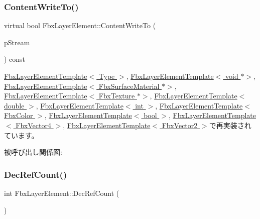 \subsubsection{\texorpdfstring{Content\+Write\+To()}{ContentWriteTo()}}
{\footnotesize\ttfamily virtual bool Fbx\+Layer\+Element\+::\+Content\+Write\+To (\begin{DoxyParamCaption}\item[{\hyperlink{class_fbx_stream}{Fbx\+Stream} \&}]{p\+Stream }\end{DoxyParamCaption}) const\hspace{0.3cm}{\ttfamily [virtual]}}



\hyperlink{class_fbx_layer_element_template_a035bb7adbe8edf5a861d6154c7ebeb8b}{Fbx\+Layer\+Element\+Template$<$ Type $>$}, \hyperlink{class_fbx_layer_element_template_a035bb7adbe8edf5a861d6154c7ebeb8b}{Fbx\+Layer\+Element\+Template$<$ void $\ast$$>$}, \hyperlink{class_fbx_layer_element_template_a035bb7adbe8edf5a861d6154c7ebeb8b}{Fbx\+Layer\+Element\+Template$<$ Fbx\+Surface\+Material $\ast$$>$}, \hyperlink{class_fbx_layer_element_template_a035bb7adbe8edf5a861d6154c7ebeb8b}{Fbx\+Layer\+Element\+Template$<$ Fbx\+Texture $\ast$$>$}, \hyperlink{class_fbx_layer_element_template_a035bb7adbe8edf5a861d6154c7ebeb8b}{Fbx\+Layer\+Element\+Template$<$ double $>$}, \hyperlink{class_fbx_layer_element_template_a035bb7adbe8edf5a861d6154c7ebeb8b}{Fbx\+Layer\+Element\+Template$<$ int $>$}, \hyperlink{class_fbx_layer_element_template_a035bb7adbe8edf5a861d6154c7ebeb8b}{Fbx\+Layer\+Element\+Template$<$ Fbx\+Color $>$}, \hyperlink{class_fbx_layer_element_template_a035bb7adbe8edf5a861d6154c7ebeb8b}{Fbx\+Layer\+Element\+Template$<$ bool $>$}, \hyperlink{class_fbx_layer_element_template_a035bb7adbe8edf5a861d6154c7ebeb8b}{Fbx\+Layer\+Element\+Template$<$ Fbx\+Vector4 $>$}, \hyperlink{class_fbx_layer_element_template_a035bb7adbe8edf5a861d6154c7ebeb8b}{Fbx\+Layer\+Element\+Template$<$ Fbx\+Vector2 $>$}で再実装されています。

被呼び出し関係図\+:
\mbox{\label{class_fbx_layer_element_a80d83d36366e1cf1f79b0e1479b5a692}} 
\subsubsection{\texorpdfstring{Dec\+Ref\+Count()}{DecRefCount()}}
{\footnotesize\ttfamily int Fbx\+Layer\+Element\+::\+Dec\+Ref\+Count (\begin{DoxyParamCaption}{ }\end{DoxyParamCaption})}

